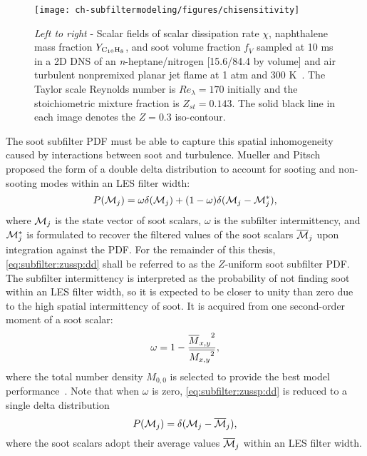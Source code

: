 \begin{figure}[htb]
  \centering
  \texttt{[image: ch-subfiltermodeling/figures/chisensitivity]}
  \caption[Spatial Variability of  and Soot Fields]{\textit{Left to right} - Scalar fields of scalar dissipation rate $\chi$, naphthalene mass fraction $Y_{\ce{C10H8}}$, and soot volume fraction $f_V$ sampled at 10 ms in a 2D DNS of an \textit{n}-heptane/nitrogen [15.6/84.4 by volume] and air turbulent nonpremixed planar jet flame at 1 atm and 300 K~\cite{bisetti2012}. The Taylor scale Reynolds number is $Re_{\lambda} = 170$ initially and the stoichiometric mixture fraction is $Z_{st} = 0.143$. The solid black line in each image denotes the $Z = 0.3$ iso-contour.} %
  \label{fig:subfilter:zussp:chisensitivity}
\end{figure}

The soot subfilter PDF must be able to capture this spatial inhomogeneity caused by interactions between soot and turbulence. Mueller and Pitsch~\cite{subfilterpdf2011} proposed the form of a double delta distribution to account for sooting and non-sooting modes within an LES filter width:
\begin{equation}\label{eq:subfilter:zussp:dd}
  P(\mathcal{M}_j) = \omega\delta(\mathcal{M}_j) + (1 - \omega)\delta(\mathcal{M}_j - \mathcal{M}_j^*),
\end{equation}
where $\mathcal{M}_j$ is the state vector of soot scalars, $\omega$ is the subfilter intermittency, and $\mathcal{M}_j^*$ is formulated to recover the filtered values of the soot scalars $\overline{\mathcal{M}}_j$ upon integration against the PDF. For the remainder of this thesis, \cref{eq:subfilter:zussp:dd} shall be referred to as the $Z$-uniform soot subfilter PDF. The subfilter intermittency is interpreted as the probability of not finding soot within an LES filter width, so it is expected to be closer to unity than zero due to the high spatial intermittency of soot. It is acquired from one second-order moment of a soot scalar:
\begin{equation}\label{eq:subfilter:zussp:omega}
  \omega = 1 - \frac{{\overline{M}_{x,y}}^2}{\overline{{M_{x,y}}^2}},
\end{equation}
where the total number density $M_{0,0}$ is selected to provide the best model performance~\cite{subfilterpdf2011}. Note that when $\omega$ is zero, \cref{eq:subfilter:zussp:dd} is reduced to a single delta distribution
\begin{equation}\label{eq:subfilter:zussp:sd}
  P(\mathcal{M}_j) = \delta(\mathcal{M}_j - \overline{\mathcal{M}}_j),
\end{equation}
where the soot scalars adopt their average values $\overline{\mathcal{M}}_j$ within an LES filter width.

